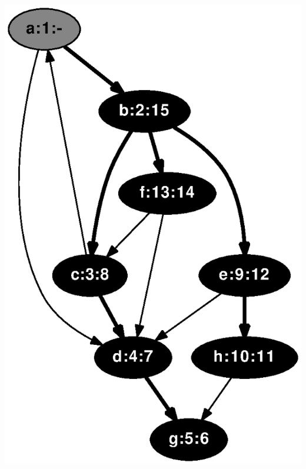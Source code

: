 \documentclass{article}
\begin{document}
\includegraphics[height=.3\textheight]{dfs_directed_classroom_15.eps}
\vspace{1em}
\end{document}

